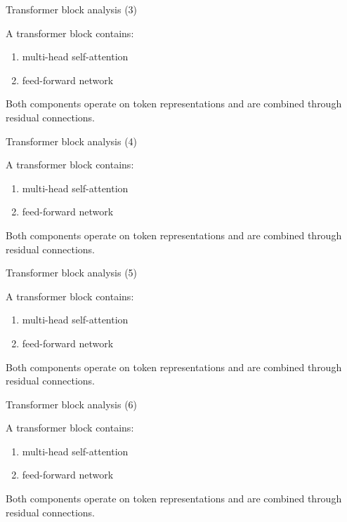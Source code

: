 \documentclass[aspectratio=169]{beamer}
\begin{document}
\begin{frame}{Transformer block analysis (3)}

A transformer block contains:

\begin{enumerate}
\item multi-head self-attention
\item feed-forward network
\end{enumerate}

Both components operate on token representations and are
combined through residual connections.

\end{frame}


\begin{frame}{Transformer block analysis (4)}

A transformer block contains:

\begin{enumerate}
\item multi-head self-attention
\item feed-forward network
\end{enumerate}

Both components operate on token representations and are
combined through residual connections.

\end{frame}


\begin{frame}{Transformer block analysis (5)}

A transformer block contains:

\begin{enumerate}
\item multi-head self-attention
\item feed-forward network
\end{enumerate}

Both components operate on token representations and are
combined through residual connections.

\end{frame}


\begin{frame}{Transformer block analysis (6)}

A transformer block contains:

\begin{enumerate}
\item multi-head self-attention
\item feed-forward network
\end{enumerate}

Both components operate on token representations and are
combined through residual connections.

\end{frame}
\end{document}
